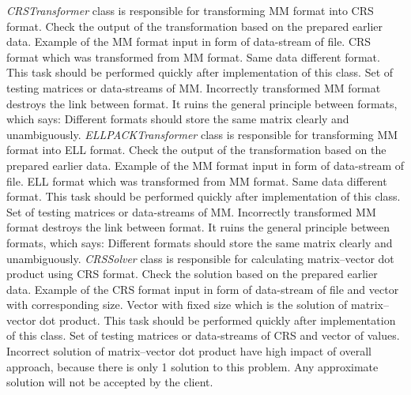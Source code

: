 	{
		{
			\emph{CRSTransformer} class is responsible for transforming \gls{MM} format into \gls{CRS} format.
		}
		{
			Check the output of the transformation based on the prepared earlier data.
		}
		{
			Example of the \gls{MM} format input in form of data-stream of file.
		}
		{
			\gls{CRS} format which was transformed from \gls{MM} format. Same data different format.
		}
		{
			This task should be performed quickly after implementation of this class.
		}
		{
			Set of testing matrices or data-streams of \gls{MM}.
		}
		{
			Incorrectly transformed \gls{MM} format destroys the link between format. It ruins the general principle between formats, which says: Different formats should store the same matrix clearly and unambiguously.
		}
	}
	{
		{
			\emph{ELLPACKTransformer} class is responsible for transforming \gls{MM} format into \gls{ELL} format.
		}
		{
			Check the output of the transformation based on the prepared earlier data.
		}
		{
			Example of the \gls{MM} format input in form of data-stream of file.
		}
		{
			\gls{ELL} format which was transformed from \gls{MM} format. Same data different format.
		}
		{
			This task should be performed quickly after implementation of this class.
		}
		{
			Set of testing matrices or data-streams of \gls{MM}.
		}
		{
			Incorrectly transformed \gls{MM} format destroys the link between format. It ruins the general principle between formats, which says: Different formats should store the same matrix clearly and unambiguously.
		}
	}
	{
		{
			\emph{CRSSolver} class is responsible for calculating matrix--vector dot product using \gls{CRS} format.
		}
		{
			Check the solution based on the prepared earlier data.
		}
		{
			Example of the \gls{CRS} format input in form of data-stream of file and vector with corresponding size.
		}
		{
			Vector with fixed size which is the solution of matrix--vector dot product.
		}
		{
			This task should be performed quickly after implementation of this class.
		}
		{
			Set of testing matrices or data-streams of \gls{CRS} and vector of values.
		}
		{
			Incorrect solution of matrix--vector dot product have high impact of overall approach, because there is only 1 solution to this problem. Any approximate solution will not be accepted by the client.
		}
	}
